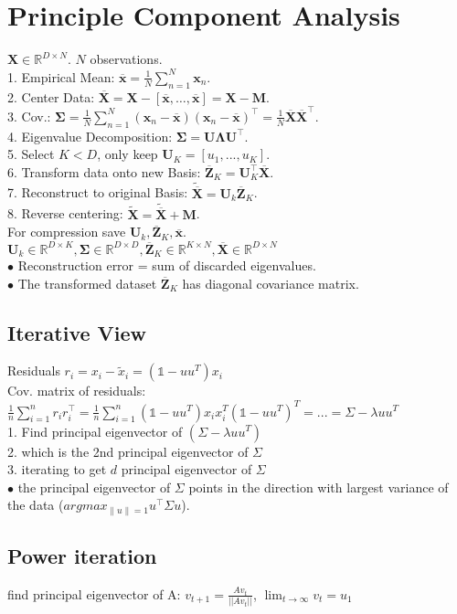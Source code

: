 \section{Principle Component Analysis}
$\mathbf{X} \in \mathbb{R}^{D \times N}$. $N$ observations.\\
1. Empirical Mean: $\overline{\mathbf{x}} = \frac{1}{N} \sum_{n=1}^N \mathbf{x}_n$.\\
2. Center Data: $\overline{\mathbf{X}} = \mathbf{X} - [\overline{\mathbf{x}}, \ldots, \overline{\mathbf{x}}] = \mathbf{X} - \mathbf{M}$.\\
3. Cov.: $\boldsymbol{\Sigma} = \frac{1}{N	} \sum_{n=1}^N (\mathbf{x}_n - \overline{\mathbf{x}}) (\mathbf{x}_n - \overline{\mathbf{x}})^\top = \frac{1}{N} \overline{\mathbf{X}}\overline{\mathbf{X}}^\top$.\\
4. Eigenvalue Decomposition: $\boldsymbol{\Sigma} = \mathbf{U} \boldsymbol{\Lambda} \mathbf{U}^\top$.\\
5. Select $K < D$, only keep $\mathbf{U}_K = [u_1,...,u_{K}]$.\\
6. Transform data onto new Basis: $\overline{\mathbf{Z}}_K = \mathbf{U}_K^\top \overline{\mathbf{X}}$.\\
7. Reconstruct to original Basis: $\tilde{\overline{\mathbf{X}}} = \mathbf{U}_k \overline{\mathbf{Z}}_K$.\\
8. Reverse centering: $\tilde{\mathbf{X}} = \tilde{\overline{\mathbf{X}}} + \mathbf{M}$.\\
For compression save $\mathbf{U}_k, \overline{\mathbf{Z}}_K, \overline{\mathbf{x}}$.\\
$\mathbf{U}_k \in \mathbb{R}^{D \times K}, \boldsymbol{\Sigma} \in \mathbb{R}^{D \times D}, \overline{\mathbf{Z}}_K \in \mathbb{R}^{K \times N}, \overline{\mathbf{X}} \in \mathbb{R}^{D \times N}$ \\
$\bullet$ Reconstruction error = sum of discarded eigenvalues. \\
$\bullet$ The transformed dataset $\overline{\mathbf{Z}}_K$ has diagonal covariance matrix.

\subsection*{Iterative View}
Residuals $r_i = x_i - \tilde{x}_i = (\mathbb{1} - uu^T)x_i$\\
Cov. matrix of residuals: $\frac{1}{n} \sum_{i=1}^n r_ir_i^\top = \frac{1}{n} \sum_{i=1}^n (\mathbb{1}-uu^T)x_i x_i^T (\mathbb{1}-uu^T)^T = ... = \Sigma - \lambda uu^T$ \\
1. Find principal eigenvector of $(\Sigma - \lambda u u^T)$\\
2. which is the 2nd principal eigenvector of $\Sigma$\\
3. iterating to get $d$ principal eigenvector of $\Sigma$ \\
$\bullet$ the principal eigenvector of $\Sigma$ points in the direction with largest variance of the data ($argmax_{\|u\|=1} u^\top \Sigma u$).

\subsection*{Power iteration}
find principal eigenvector of A: $v_{t+1} = \frac{Av_t}{||Av_t||}$, $\lim_{t \rightarrow \infty} v_t = u_1$\\

